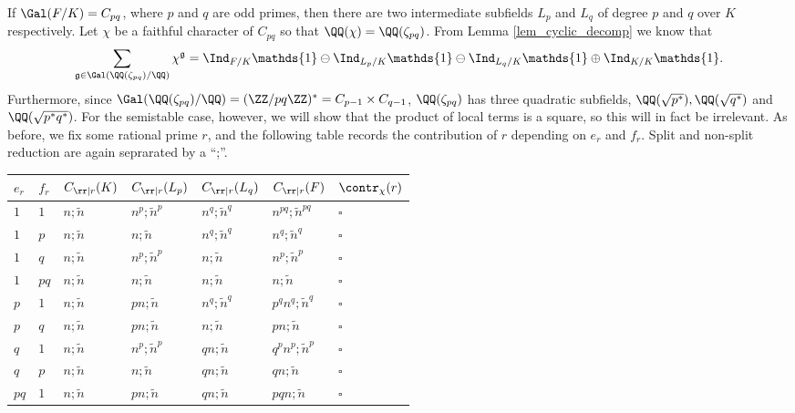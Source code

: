 If $\Gal(F/K)=C_{pq}$, where $p$ and $q$ are odd primes, then there are two intermediate subfields $L_p$ and  $L_q$ of degree $p$ and $q$ over $K$ respectively. Let $\chi$ be a faithful character of $C_{pq}$ so that $\QQ(\chi)=\QQ(\zeta_{pq})$. From Lemma \ref*{lem_cyclic_decomp} we know that 
$$\sum_{\mathfrak{g}\in\Gal(\QQ(\zeta_{pq})/\QQ)}\chi^{\mathfrak{g}}=\Ind_{F/K}\mathds{1}\ominus\Ind_{L_p/K}\mathds{1}\ominus\Ind_{L_q/K}\mathds{1}\oplus\Ind_{K/K}\mathds{1}.$$
Furthermore, since $\Gal(\QQ(\zeta_{pq})/\QQ)=(\ZZ/pq\ZZ)^*=C_{p-1}\times C_{q-1}$, $\QQ(\zeta_{pq})$ has three quadratic subfields, $\QQ(\sqrt{p^*}), \QQ(\sqrt{q^*})$ and $\QQ(\sqrt{p^*q^*})$. For the semistable case, however, we will show that the product of local terms is a square, so this will in fact be irrelevant. As before, we fix some rational prime $r$, and the following table records the contribution of $r$ depending on $e_r$ and $f_r$. Split and non-split reduction are again seprarated by a ``;''.


\begin{table}[!ht]
    \centering
    \begin{tabular}{|l|l|l|l|l|l|l|}
    \hline
    $e_r$ & $f_r$  & $C_{\rr\mid r}(K)$ & $C_{\rr\mid r}(L_p)$ & $C_{\rr\mid r}(L_q)$ & $C_{\rr\mid r}(F)$ & $\contr_\chi(r)$ \\ \hline
    $1$ & $1$ & $n;\tilde{n}$ & $n^p;\tilde{n}^p$ & $n^q;\tilde{n}^q$ & $n^{pq};\tilde{n}^{pq}$ & $\square$ \\ \hline
    $1$ & $p$ & $n;\tilde{n}$ & $n;\tilde{n}$ & $n^q;\tilde{n}^q$ & $n^q;\tilde{n}^q$ & $\square$ \\ \hline
    $1$ & $q$ & $n;\tilde{n}$ & $n^p;\tilde{n}^p$ & $n;\tilde{n}$ & $n^p;\tilde{n}^p$ & $\square$ \\ \hline
    $1$ & $pq$ & $n;\tilde{n}$ & $n;\tilde{n}$ & $n;\tilde{n}$ & $n;\tilde{n}$ & $\square$ \\ \hline
    $p$ & $1$ & $n;\tilde{n}$ & $pn;\tilde{n}$ & $n^q;\tilde{n}^q$ & $p^qn^q;\tilde{n}^q$ & $\square$ \\ \hline
    $p$ & $q$ & $n;\tilde{n}$ & $pn;\tilde{n}$ & $n;\tilde{n}$ & $pn;\tilde{n}$ & $\square$ \\ \hline
    $q$ & $1$ & $n;\tilde{n}$ & $n^p;\tilde{n}^p$ & $qn;\tilde{n}$ & $q^pn^p;\tilde{n}^p$ & $\square$ \\ \hline
    $q$ & $p$ & $n;\tilde{n}$ & $n;\tilde{n}$ & $qn;\tilde{n}$ & $qn;\tilde{n}$ & $\square$ \\ \hline
    $pq$ & $1$ & $n;\tilde{n}$ & $pn;\tilde{n}$ & $qn;\tilde{n}$ & $pqn;\tilde{n}$ & $\square$ \\ \hline
    \end{tabular}
\end{table}

